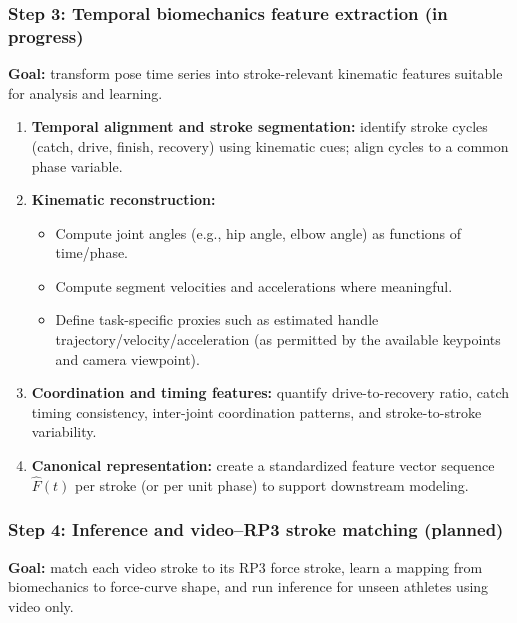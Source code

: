 \documentclass[11pt]{article}
\begin{document}
\subsubsection*{Step 3: Temporal biomechanics feature extraction (in progress)}
\textbf{Goal:} transform pose time series into stroke-relevant kinematic features suitable for analysis and learning.

\begin{enumerate}
	\item \textbf{Temporal alignment and stroke segmentation:} identify stroke cycles (catch, drive, finish, recovery) using kinematic cues; align cycles to a common phase variable.
	\item \textbf{Kinematic reconstruction:}
	      \begin{itemize}
		      \item Compute joint angles (e.g., hip angle, elbow angle) as functions of time/phase.
		      \item Compute segment velocities and accelerations where meaningful.
		      \item Define task-specific proxies such as estimated handle trajectory/velocity/acceleration (as permitted by the available keypoints and camera viewpoint).
	      \end{itemize}
	\item \textbf{Coordination and timing features:} quantify drive-to-recovery ratio, catch timing consistency, inter-joint coordination patterns, and stroke-to-stroke variability.
	\item \textbf{Canonical representation:} create a standardized feature vector sequence $\hat{F}(t)$ per stroke (or per unit phase) to support downstream modeling.
\end{enumerate}

\subsubsection*{Step 4: Inference and video--RP3 stroke matching (planned)}
\textbf{Goal:} match each video stroke to its RP3 force stroke, learn a mapping from biomechanics to force-curve shape, and run inference for unseen athletes using video only.
\end{document}
